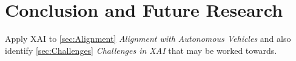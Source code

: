 \section{Conclusion and Future Research}

Apply XAI to \ref{sec:Alignment} \textit{Alignment with Autonomous Vehicles} and also identify \ref{sec:Challenges} \textit{Challenges in XAI} that may be worked towards.
